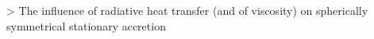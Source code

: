 \documentclass[main.tex]{subfiles}
\begin{document}
> The influence of radiative heat transfer (and of viscosity) on spherically symmetrical stationary accretion
\end{document}

